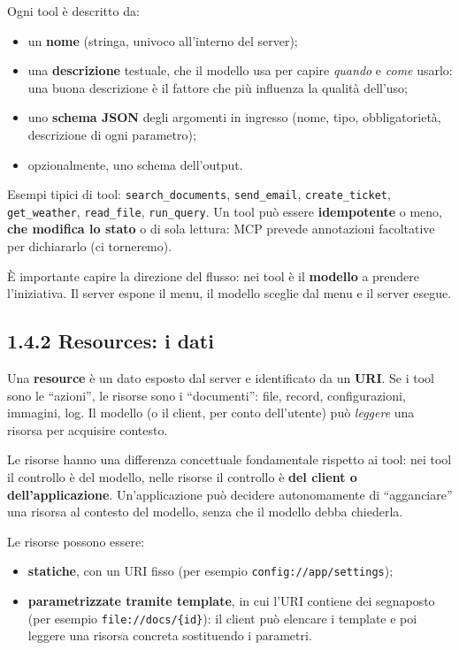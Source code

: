 \documentclass[
  italian,
  10pt,
]{book}
\providecommand{\tightlist}{%
  \setlength{\itemsep}{0pt}\setlength{\parskip}{0pt}}
\begin{document}
Ogni tool è descritto da:

\begin{itemize}
\tightlist
\item
  un \textbf{nome} (stringa, univoco all'interno del server);
\item
  una \textbf{descrizione} testuale, che il modello usa per capire
  \emph{quando} e \emph{come} usarlo: una buona descrizione è il fattore
  che più influenza la qualità dell'uso;
\item
  uno \textbf{schema JSON} degli argomenti in ingresso (nome, tipo,
  obbligatorietà, descrizione di ogni parametro);
\item
  opzionalmente, uno schema dell'output.
\end{itemize}

Esempi tipici di tool: \texttt{search\_documents}, \texttt{send\_email},
\texttt{create\_ticket}, \texttt{get\_weather}, \texttt{read\_file},
\texttt{run\_query}. Un tool può essere \textbf{idempotente} o meno,
\textbf{che modifica lo stato} o di sola lettura: MCP prevede
annotazioni facoltative per dichiararlo (ci torneremo).

È importante capire la direzione del flusso: nei tool è il
\textbf{modello} a prendere l'iniziativa. Il server espone il menu, il
modello sceglie dal menu e il server esegue.

\subsection{1.4.2 Resources: i dati}\label{resources-i-dati}

Una \textbf{resource} è un dato esposto dal server e identificato da un
\textbf{URI}. Se i tool sono le ``azioni'', le risorse sono i
``documenti'': file, record, configurazioni, immagini, log. Il modello
(o il client, per conto dell'utente) può \emph{leggere} una risorsa per
acquisire contesto.

Le risorse hanno una differenza concettuale fondamentale rispetto ai
tool: nei tool il controllo è del modello, nelle risorse il controllo è
\textbf{del client o dell'applicazione}. Un'applicazione può decidere
autonomamente di ``agganciare'' una risorsa al contesto del modello,
senza che il modello debba chiederla.

Le risorse possono essere:

\begin{itemize}
\tightlist
\item
  \textbf{statiche}, con un URI fisso (per esempio
  \texttt{config://app/settings});
\item
  \textbf{parametrizzate tramite template}, in cui l'URI contiene dei
  segnaposto (per esempio \texttt{file://docs/\{id\}}): il client può
  elencare i template e poi leggere una risorsa concreta sostituendo i
  parametri.
\end{itemize}
\end{document}
